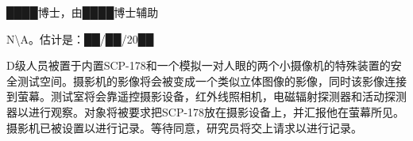 
\hr


████博士，由████博士辅助

N\textbackslash A。估计是：██\slash ██\slash 20██

D级人员被置于内置SCP-178和一个模拟一对人眼的两个小摄像机的特殊装置的安全测试空间。摄影机的影像将会被变成一个类似立体图像的影像，同时该影像连接到萤幕。测试室将会靠遥控摄影设备，红外线照相机，电磁辐射探测器和活动探测器以进行观察。对象将被要求把SCP-178放在摄影设备上，并汇报他在萤幕所见。摄影机已被设置以进行记录。等待同意，研究员将交上请求以进行记录。

